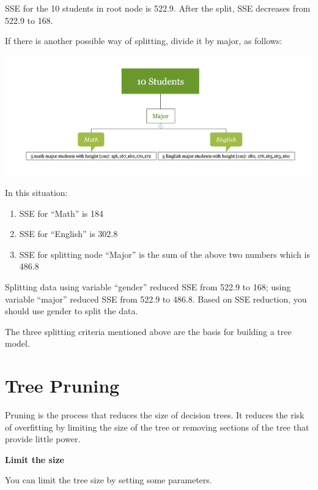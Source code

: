 \documentclass[
  12pt,
]{krantz}
\providecommand{\tightlist}{%
  \setlength{\itemsep}{0pt}\setlength{\parskip}{0pt}}
\begin{document}
SSE for the 10 students in root node is 522.9. After the split, SSE decreases from 522.9 to 168.

If there is another possible way of splitting, divide it by major, as follows:

\includegraphics{images/varEN2.png}

In this situation:

\begin{enumerate}
\def\labelenumi{\arabic{enumi}.}
\tightlist
\item
  SSE for ``Math'' is 184
\item
  SSE for ``English'' is 302.8
\item
  SSE for splitting node ``Major'' is the sum of the above two numbers which is 486.8
\end{enumerate}

Splitting data using variable ``gender'' reduced SSE from 522.9 to 168; using variable ``major'' reduced SSE from 522.9 to 486.8. Based on SSE reduction, you should use gender to split the data.

The three splitting criteria mentioned above are the basis for building a tree model.

\hypertarget{tree-pruning}{%
\section{Tree Pruning}\label{tree-pruning}}

Pruning is the process that reduces the size of decision trees. It reduces the risk of overfitting by limiting the size of the tree or removing sections of the tree that provide little power.

\textbf{Limit the size}

You can limit the tree size by setting some parameters.
\end{document}

